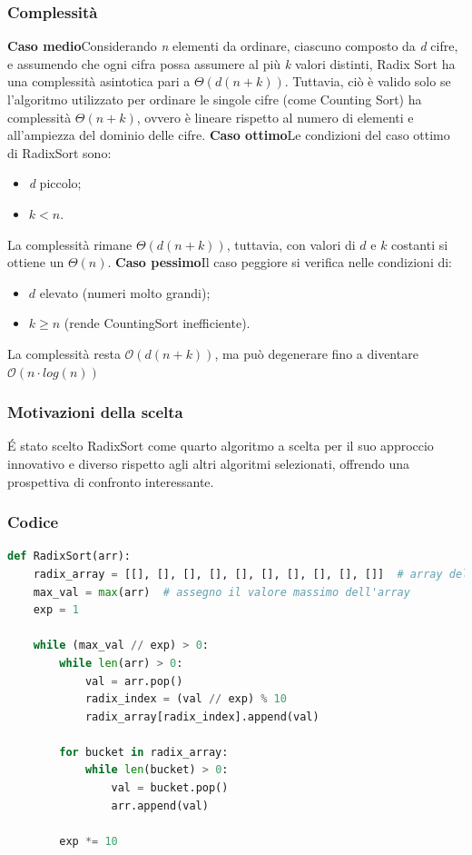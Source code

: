 \documentclass[a4paper, 11pt]{article}
\begin{document}
\subsubsection*{Complessità}
\textbf{Caso medio}\quad Considerando \textit{n} elementi da ordinare, ciascuno composto da \textit{d} cifre, e assumendo che ogni cifra possa assumere al più \textit{k} valori distinti, Radix Sort ha una complessità asintotica pari a $\Theta(d(n + k))$.\bigbreak
\noindent Tuttavia, ciò è valido solo se l'algoritmo utilizzato per ordinare le singole cifre (come Counting Sort) ha complessità $\Theta(n + k)$, ovvero è lineare rispetto al numero di elementi e all'ampiezza del dominio delle cifre.\bigbreak
\noindent \textbf{Caso ottimo}\quad Le condizioni del caso ottimo di RadixSort sono:
\begin{itemize}
    \item \textit{d} piccolo;
    \item $k < n$.
\end{itemize}
La complessità rimane $\Theta(d(n + k))$, tuttavia, con valori di $d$ e $k$ costanti si ottiene un $\Theta(n)$.\bigbreak
\noindent \textbf{Caso pessimo}\quad Il caso peggiore si verifica nelle condizioni di:
\begin{itemize}
    \item $d$ elevato (numeri molto grandi);
    \item $k \geq n$ (rende CountingSort inefficiente).
\end{itemize}
La complessità resta $\mathcal{O}(d(n + k))$, ma può degenerare fino a diventare $\mathcal{O}(n\cdot log(n))$
\subsubsection{Motivazioni della scelta}
É stato scelto RadixSort come quarto algoritmo a scelta per il suo approccio innovativo e diverso rispetto agli altri algoritmi selezionati, offrendo una prospettiva di confronto interessante.

\subsubsection{Codice}
\begin{lstlisting}[style=mycodestyle, language=Python]
def RadixSort(arr):
    radix_array = [[], [], [], [], [], [], [], [], [], []]  # array delle cifre
    max_val = max(arr)  # assegno il valore massimo dell'array
    exp = 1 

    while (max_val // exp) > 0:
        while len(arr) > 0:
            val = arr.pop()
            radix_index = (val // exp) % 10
            radix_array[radix_index].append(val)

        for bucket in radix_array:
            while len(bucket) > 0:
                val = bucket.pop()
                arr.append(val)

        exp *= 10
\end{lstlisting}
\end{document}
